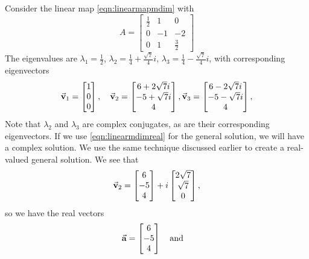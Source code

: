 \begin{xexample}
Consider the linear map \eqref{eqn:linearmapmdim} with
\begin{equation}
   A = \begin{bmatrix}
            \frac{1}{2} &  1  &  0 \\
              0         & -1  & -2 \\
              0         &  1  & \frac{3}{2}
       \end{bmatrix}
\end{equation}
The eigenvalues are
$\lambda_1 = \frac{1}{2}$,
$\lambda_2 = \frac{1}{4} + \frac{\sqrt{7}}{4}i$,
$\lambda_3 = \frac{1}{4} - \frac{\sqrt{7}}{4}i$,
with corresponding eigenvectors
\begin{equation}
  \vec{\textbf{v}}_1 = \begin{bmatrix} 1  \\ 0 \\ 0 \end{bmatrix}, \quad
  \vec{\textbf{v}}_2 = \begin{bmatrix} 6 + 2\sqrt{7}i \\ -5 + \sqrt{7} i \\ 4\end{bmatrix},
  \vec{\textbf{v}}_3 = \begin{bmatrix} 6 - 2\sqrt{7}i \\ -5 - \sqrt{7} i \\ 4\end{bmatrix},
\end{equation}
Note that $\lambda_2$ and $\lambda_3$ are complex conjugates,
as are their corresponding eigenvectors.
If we use \eqref{eqn:linearmdimreal} for the general solution,
we will have a complex solution.  We use the same technique
discussed earlier to create a real-valued general solution.
We see that
\begin{equation}
   \vec{\textbf{v}}_2 = \begin{bmatrix} 6 \\ -5 \\ 4 \end{bmatrix}
           + i \begin{bmatrix} 2\sqrt{7} \\ \sqrt{7} \\ 0\end{bmatrix}, 
\end{equation}
so we have the real vectors
\begin{equation}
    \BA = \begin{bmatrix} 6 \\ -5 \\ 4 \end{bmatrix} \quad \textrm{and} \quad

\end{equation}
\end{xexample}
